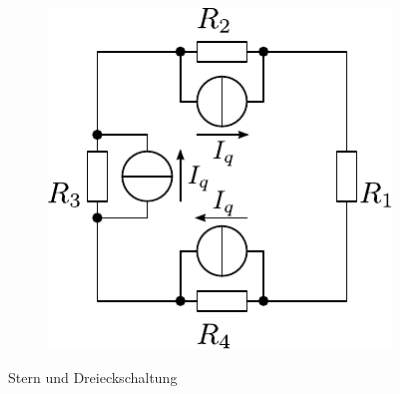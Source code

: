 \begin{figure}[h!]
\begin{subfigure}[b]{0.3\textwidth}
		\label{sch:qversch_iq2}
	\end{subfigure}
	\begin{subfigure}[b]{0.3\textwidth}
		\centering
		\includegraphics[scale=\schscale]{qversch_iq3_sch.pdf}
		\label{sch:qversch_iq3}
	\end{subfigure}
	\caption{Stern und Dreieckschaltung}
	\label{sch:tristar}
\end{figure}
